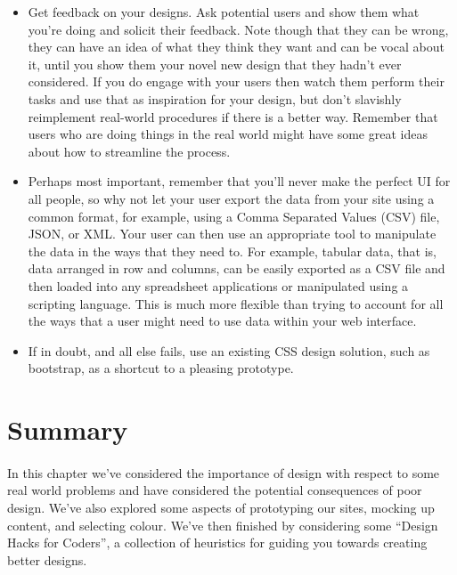 \begin{itemize}
\item Get feedback on your designs. Ask potential users and show them what you're doing and solicit their feedback. Note though that they can be wrong, they can have an idea of what they think they want and can be vocal about it, until you show them your novel new design that they hadn't ever considered. If you do engage with your users then watch them perform their tasks and use that as inspiration for your design, but don’t slavishly reimplement real-world procedures if there is a better way. Remember that users who are doing things in the real world might have some great ideas about how to streamline the process.
\item Perhaps most important, remember that you’ll never make the perfect UI for all people, so why not let your user export the data from your site using a common format, for example, using a Comma Separated Values (CSV) file, JSON, or XML. Your user can then use an appropriate tool to manipulate the data in the ways that they need to. For example, tabular data, that is, data arranged in row and columns, can be easily exported as a CSV file and then loaded into any spreadsheet applications or manipulated using a scripting language. This is much more flexible than trying to account for all the ways that a user might need to use data within your web interface.
\item If in doubt, and all else fails, use an existing CSS design solution, such as bootstrap, as a shortcut to a pleasing prototype.
\end{itemize}


\section{Summary}
\paragraph{} In this chapter we've considered the importance of design with respect to some real world problems and have considered the potential consequences of poor design. We've also explored some aspects of prototyping our sites, mocking up content, and selecting colour. We've then finished by considering some ``Design Hacks for Coders'', a collection of heuristics for guiding you towards creating better designs.


